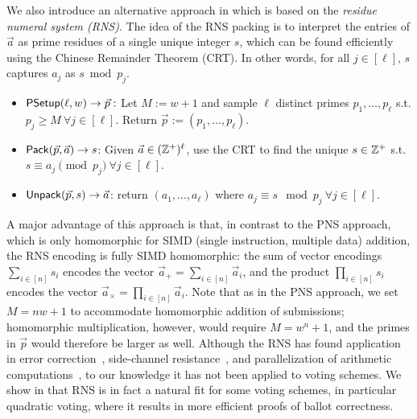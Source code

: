 We also introduce an alternative approach in  which is based on the \emph{residue numeral system (RNS)}. The idea of the RNS packing is to interpret the entries of $\vec{a}$ as prime residues of a single unique integer $s$, which can be found efficiently using the Chinese Remainder Theorem (CRT). In other words, for all $j \in [\ell]$, $s$ captures $a_j$ as $s \bmod p_j$.

\begin{construction}\label{con:packingRNS}
\hfill
\begin{itemize}%
    \item $\mathsf{PSetup}(\ell, w) \to \vec{p}:$ Let $M := w + 1$ and sample $\ell$ distinct primes $p_1, \dots, p_\ell$ s.t. $p_j \geq M\ \forall j \in [\ell]$. Return $\vec{p} := (p_1, \dots, p_\ell)$.
    \item $\mathsf{Pack}(\vec{p}, \Vec{a}) \to s$: Given $\Vec{a} \in (\mathbb{Z}^+)^\ell$, use the CRT to find the unique $s \in \mathbb{Z}^+$ s.t. $s\equiv a_j \pmod{p_j}~\forall j\in[\ell]$.
    \item $\mathsf{Unpack}(\vec{p}, s) \to \Vec{a}$: return $(a_1, \dots, a_\ell)$ where $a_j \equiv s \mod{p_j}\ \forall j \in [\ell]$.
\end{itemize}
\end{construction}

A major advantage of this approach is that, in contrast to the PNS approach, which is only homomorphic for SIMD (single instruction, multiple data) addition, the RNS encoding is fully SIMD homomorphic: the sum of vector encodings $\sum_{i \in [n]} s_i$ encodes the vector $\vec{a}_{+} = \sum_{i \in [n]} \vec{a}_i$, and the product $\prod_{i \in [n]} s_i$ encodes the vector $\vec{a}_{\times} = \prod_{i \in [n]} \vec{a}_i$. Note that as in the PNS approach, we set $M = nw + 1$ to accommodate homomorphic addition of submissions; homomorphic multiplication, however, would require $M = w^n+1$, and the primes in $\vec{p}$ would therefore be larger as well.
Although the RNS has found application in error correction~\cite{KPTOC22,TaiCha14}, side-channel resistance~\cite{TCHES:PFPB18}, and parallelization of arithmetic computations~\cite{AsiHosKon17,BajDuqMel06,GomTyaNam11,VNLVC20}, to our knowledge it has not been applied to voting schemes. We show in \cite{EPRINT:GSZB23} that RNS is in fact a natural fit for some voting schemes, in particular quadratic voting, where it results in more efficient proofs of ballot correctness. 

